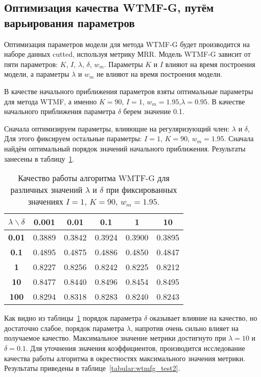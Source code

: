 \subsection{Оптимизация качества WTMF-G, путём варьирования параметров}
    Оптимизация параметров модели для метода WTMF-G будет производится на наборе данных cutted, используя метрику МRR.
    Модель WTMF-G зависит от пяти параметров: $K$, $I$, $\lambda$, $\delta$, $w_m$.
    Параметры $K$ и $I$ влияют на время построения модели, а параметры $\lambda$ и $w_m$ не влияют на время построения модели.

    В качестве начального приближения параметров взяты оптимальные параметры для метода WTMF, а именно $K=90$, $I=1$, $w_m=1.95$,$\lambda=0.95$. В качестве начального приближения параметра $\delta$ берем значение 0.1.

    Сначала оптимизируем параметры, влияющие на регуляризующий член: $\lambda$ и $\delta$,
    Для этого фиксируем остальные параметры: $I=1$, $K=90$, $w_m=1.95$.
    Сначала найдём оптимальный порядок значений начального приближения. Результаты занесены в таблицу~\ref{tabular:wtmfg_test1}.

    \begin{table}[ht!]
        \caption{Качество работы алгоритма WMTF-G для различных значений $\lambda$ и $\delta$ при фиксированных значениях $I=1$, $K=90$, $w_m=1.95$. \bigskip}
        \centering

        \label{tabular:wtmfg_test1}
        \begin{tabular}{|c|c|c|c|c|c|} \hline
            $\lambda \backslash \delta$ & \bf{0.001} & \bf{0.01} & \bf{0.1} & \bf{1} & \bf{10}  \\ \hline
            \bf{0.01} & 0.3889 & 0.3842 & 0.3924 & 0.3900 & 0.3895 \\ \hline
            \bf{0.1}  & 0.4895 & 0.4875 & 0.4886 & 0.4850 & 0.4847  \\ \hline
            \bf{1}    & 0.8227 & 0.8256 & 0.8242 & 0.8225 & 0.8212 \\ \hline
            \bf{10}   & 0.8477 & 0.8440 & 0.8496 & 0.8454 & 0.8495 \\ \hline
            \bf{100}  & 0.8294 & 0.8318 & 0.8283 & 0.8240  & 0.8243 \\ \hline
        \end{tabular}
    \end{table}

    Как видно из таблицы~\ref{tabular:wtmfg_test1} порядок параметра $\delta$ оказывает влияние на качество, но достаточно слабое, порядок параметра $\lambda$, напротив очень сильно влияет на получаемое качество.
    Максимальное значение метрики достигнуто при $\lambda=10$ и $\delta=0.1$.
    Для уточнения значения коэффициентов, производится исследование качества работы алгоритма в окрестностях максимального значения метрики.
    Результаты приведены в таблице~\ref{tabular:wtmfg_test2}.

